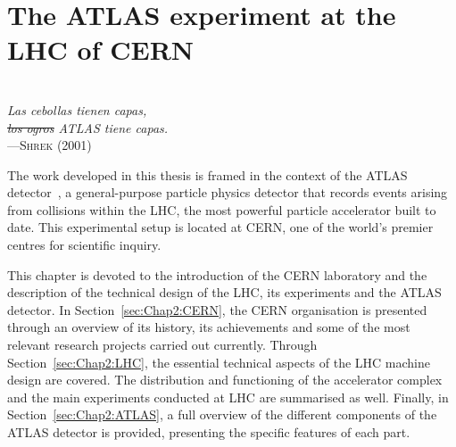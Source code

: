 \begin{comment}
%
asdf
\end{comment}


\chapter{The ATLAS experiment at the LHC of CERN}

\vspace*{0.1 cm} 
\hspace*{300pt} \\
\hspace*{220pt} \textit{Las cebollas tienen capas,} \\
\hspace*{220pt} \textit{\sout{los ogros} ATLAS tiene capas.} \\
\hspace*{240pt} ---\textsc{Shrek (2001)} \\%
\vspace*{2cm} 

\label{chap:ATLAS}

The work developed in this thesis is framed in the context of the ATLAS detector~\cite{ATLAS:1999vwa}, 
a general-purpose particle physics detector that records events arising from collisions within the 
LHC, the most powerful particle accelerator built to date. 
This experimental setup is located at CERN, one of the world's premier centres for scientific inquiry.

This chapter is devoted to the introduction of the CERN laboratory and the description of the technical
design of the LHC, its experiments and the ATLAS detector.
In Section~\ref{sec:Chap2:CERN}, the CERN organisation is presented through an overview of its history, its achievements and 
some of the most relevant research projects carried out currently.
Through Section~\ref{sec:Chap2:LHC}, the essential technical aspects of the LHC machine design are covered. 
The distribution and functioning of the
accelerator complex and the main experiments conducted at LHC are summarised as well. 
Finally, in Section~\ref{sec:Chap2:ATLAS}, a full overview of the different components of the ATLAS detector is provided, presenting
the specific features of each part.


